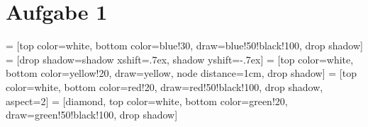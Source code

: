 \documentclass[a4paper,10pt,]{scrartcl}
\begin{document}
\section*{Aufgabe 1}

\usetikzlibrary{positioning}
\usetikzlibrary{shadows}

 = [top color=white, bottom color=blue!30, 
                            draw=blue!50!black!100, drop shadow]
 = [drop shadow={shadow xshift=.7ex, 
                                 shadow yshift=-.7ex}]
 = [top color=white, bottom color=yellow!20, 
                               draw=yellow, node distance=1cm, drop shadow]
 = [top color=white, bottom color=red!20, 
                                  draw=red!50!black!100, drop shadow, aspect=2]
 = [diamond, top color=white, bottom color=green!20, 
                         draw=green!50!black!100, drop shadow]
\end{document}
